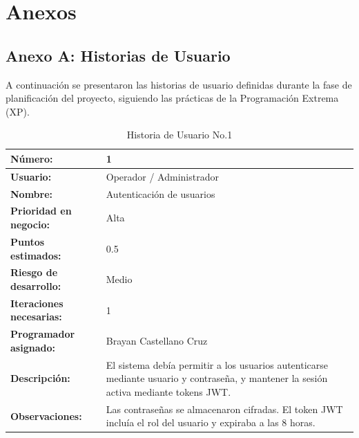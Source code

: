 \chapter*{Anexos}
{}

\section*{Anexo A: Historias de Usuario}

A continuación se presentaron las historias de usuario definidas durante la fase de planificación del proyecto, siguiendo las prácticas de la Programación Extrema (XP).

\begin{table}[H]
\centering
\caption{Historia de Usuario No.1}
\label{tab:hu_01}
\footnotesize
\begin{tabular}{|p{3cm}|p{9cm}|}
\hline
\textbf{Número:} & 1 \\
\hline
\textbf{Usuario:} & Operador / Administrador \\
\hline
\textbf{Nombre:} & Autenticación de usuarios \\
\hline
\textbf{Prioridad en negocio:} & Alta \\
\hline
\textbf{Puntos estimados:} & 0.5 \\
\hline
\textbf{Riesgo de desarrollo:} & Medio \\
\hline
\textbf{Iteraciones necesarias:} & 1 \\
\hline
\textbf{Programador asignado:} & Brayan Castellano Cruz \\
\hline
\textbf{Descripción:} & El sistema debía permitir a los usuarios autenticarse mediante usuario y contraseña, y mantener la sesión activa mediante tokens JWT. \\
\hline
\textbf{Observaciones:} & Las contraseñas se almacenaron cifradas. El token JWT incluía el rol del usuario y expiraba a las 8 horas. \\
\hline
\end{tabular}
\end{table}

